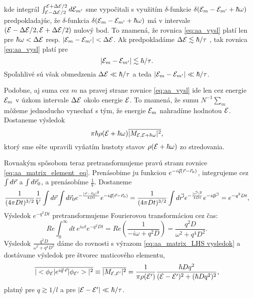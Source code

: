 kde integrál $\int_{\mathcal{E}-\Delta \mathcal{E}/2}^{\mathcal{E}+\Delta \mathcal{E}/2} d\mathcal{E}_{m'}$ sme vypočitali s využitím $\delta$-funkcie $\delta(\mathcal{E}_m-\mathcal{E}_{m'}+\hbar \omega)$ predpokladajúc, že
$\delta$-funkcia $\delta(\mathcal{E}_m-\mathcal{E}_{m'}+\hbar \omega)$ má v intervale $(\mathcal{E}-\Delta \mathcal{E}/2,\mathcal{E}+\Delta \mathcal{E}/2)$ nulový bod.
To znamená, že rovnica \eqref{eq:aa_vysl} platí
len pre  $\hbar \omega < \Delta \mathcal{E}$ resp. $|\mathcal{E}_m-\mathcal{E}_{m'}| < \Delta \mathcal{E}$. Ak predpokladáme $\Delta \mathcal{E} \lesssim  \hbar/ \tau$ , tak rovnica \eqref{eq:aa_vysl} platí
pre
\begin{equation}
 \label{eq:restrikcia na energ}
|\mathcal{E}_m-\mathcal{E}_{m'}| \lesssim  \hbar/ \tau  \text{.}
\end{equation}
Spoľahlivé sú však obmedzenia $\Delta \mathcal{E} \ll  \hbar/ \tau$ a teda $|\mathcal{E}_m-\mathcal{E}_{m'}| \ll  \hbar/ \tau$.



Podobne, aj suma cez $m$ na pravej strane rovnice \eqref{eq:aa_vysl} ide len cez energie $\mathcal{E}_{m}$ v úzkom intervale $\Delta \mathcal{E}$ okolo energie $\mathcal{E}$. To znamená, že
sumu $N^{-1}\sum_m$ môžeme jednoducho vynechať s tým, že energie $\mathcal{E}_{m}$ nahradíme hodnotou $\mathcal{E}$. Dostaneme výsledok
\begin{equation}
 \label{eq:aa_matrix_LHS vysledok}
\pi \hbar \rho(\mathcal{E}+\hbar\omega) \overline{ |M_{\mathcal{E}, \mathcal{E}+\hbar\omega}|^2}  \text{,}
\end{equation}
ktorý sme ešte upravili vyňatím hustoty stavov $\rho(\mathcal{E}+\hbar\omega)$ zo stredovania.


Rovnakým spôsobom teraz pretransformujeme pravú stranu rovnice \eqref{eq:aa_matrix_element_eq}. Prenásobime ju funkciou $e^{-i\vec{q}(\vec{r}-\vec{r}_0)}$, integrujeme cez $\int d\vec{r}$ a $\int d\vec{r}_0$, a prenásobíme $\frac{1}{V}$. Dostaneme
\begin{equation}
\label{eq:aa_matrix_RHS begin}
 \frac{1}{(4\pi Dt)^{3/2}}\frac{1}{V} \int d\vec{r} \int d\vec{r}_0 e^{-\frac{|\vec{r}-\vec{r}_0|^2}{4Dt}}e^{-i\vec{q}(\vec{r}-\vec{r}_0)} =
 \frac{1}{(4\pi Dt)^{3/2}}\int d\vec{r'} e^{-\frac{|\vec{r'}|^2}{4Dt}}e^{-i\vec{q} \vec{r'}} = e^{-q^2Dt}\text{,}
\end{equation}
Výsledok $e^{-q^2Dt}$  pretransformujeme Fourierovou transformáciou cez čas:
\begin{equation}
\label{eq:aa_matrix_RHS}
 Re{\int_0^{\infty}dt\ e^{i\omega t}e^{-q^2Dt}}=Re(\frac{1}{-i\omega+q^2D})=\frac{q^2D}{\omega^2+q^4D^2}\text{.}
\end{equation}
Výsledok $\frac{q^2D}{\omega^2+q^4D^2}$ dáme do rovnosti s výrazom \eqref{eq:aa_matrix_LHS vysledok} a dostávame výsledok
pre štvorec maticového elementu,
\begin{equation}
 \label{eq:aa_matrix_element_final}
\overline{|<\phi_{\mathcal{E}}|e^{i\vec{q}\cdot\vec{r}}|\phi_{\mathcal{E}'}>|^2} \equiv \overline{|M_{\mathcal{E}, \mathcal{E}'}|^2}=\frac{1}{\pi \rho(\mathcal{E}')} \frac{\hbar D q^2}{(\mathcal{E}-\mathcal{E}')^2+(\hbar Dq^2)^2}\text{,}
\end{equation}
platný pre $q \gtrsim 1/l$ a pre $|\mathcal{E}-\mathcal{E}'| \ll \hbar/ \tau$.

